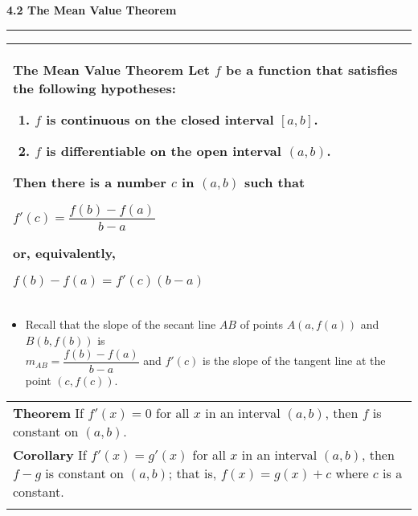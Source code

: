 \documentclass{article}
\begin{document}
\begin{center}
\Large\textbf{4.2 The Mean Value Theorem}

\noindent\hfill\rule{0.3\textwidth}{.4pt}\hfill
\vspace{20pt}

\begin{center}
\large
\def\arraystretch{1.3}
{\setlength{\tabcolsep}{16pt}
\begin{tabularx}{.9\textwidth}{|X|}
\hline
	\vspace{5pt}
	\textbf{The Mean Value Theorem} \: Let $f$ be a function that satisfies the following hypotheses: 
	\vspace{10pt}
	\begin{enumerate}[itemsep=5pt]
	\item $f$ is continuous on the closed interval $[a,b]$.
	\item $f$ is differentiable on the open interval $(a,b)$.
	\end{enumerate} 
	\vspace{10pt}
	Then there is a number $c$ in $(a,b)$ such that
	\vspace{5pt}
	\begin{center}
	$f'(c) = \dfrac{f(b)-f(a)}{b-a}$
	\end{center}
	or, equivalently,
	\begin{center}
	$f(b)-f(a) = f'(c)(b-a)$
	\end{center}
	\\[5pt]
	\hline
\end{tabularx}}
\end{center}

\large
\vspace{16pt}
\begin{itemize}[leftmargin=5pt]
	\item Recall that the slope of the secant line $AB$ of points $A(a,f(a))$ and $B(b,f(b))$ is \\[3pt]
	$m_{AB} = \dfrac{f(b)-f(a)}{b-a}$ and $f'(c)$ is the slope of the tangent line at the point $(c, f(c))$.
\end{itemize}
\vspace{16pt}

\begin{center}
\large
\def\arraystretch{1.3}
{\setlength{\tabcolsep}{16pt}
\begin{tabularx}{.9\textwidth}{|X|}
\hline
	\vspace{.5pt}
	\textbf{Theorem} \: If $f'(x) = 0$ for all $x$ in an interval $(a,b)$, then $f$ is constant on $(a,b)$. \\
	\vspace{.5pt}
	\textbf{Corollary} \: If $f'(x) = g'(x)$ for all $x$ in an interval $(a,b)$, then $f-g$ is constant on $(a,b)$; that is, $f(x) = g(x) + c$ where $c$ is a constant. \\
\vspace{.5pt}\\
\hline
\end{tabularx}}
\end{center}
\end{center}
\pagebreak
\end{document}
